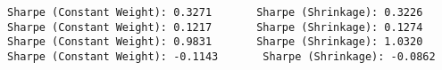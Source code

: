\documentclass[11pt]{article}
\begin{document}
    \begin{Verbatim}[commandchars=\\\{\}]
Sharpe (Constant Weight): 0.3271       Sharpe (Shrinkage): 0.3226
Sharpe (Constant Weight): 0.1217       Sharpe (Shrinkage): 0.1274
Sharpe (Constant Weight): 0.9831       Sharpe (Shrinkage): 1.0320
Sharpe (Constant Weight): -0.1143       Sharpe (Shrinkage): -0.0862

    \end{Verbatim}

    \begin{center}
    \end{center}

    
    
    
\end{document}
